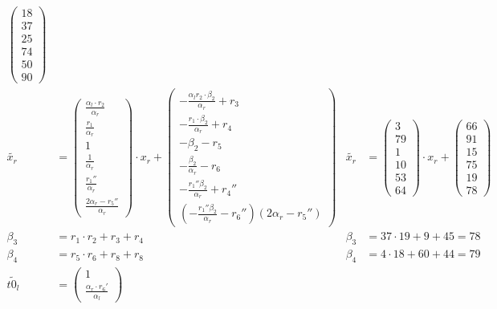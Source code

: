 \begin{align*}
\begin{pmatrix}18\\37\\25\\74\\50\\90\end{pmatrix}\\
%
\widetilde{x_r} & =
\begin{pmatrix}
  \frac{\alpha_l \cdot r_2}{\alpha_r}\\
  \frac{r_1}{\alpha_r}\\
  1\\
  \frac{1}{\alpha_r}\\
  \frac{r_1''}{\alpha_r}\\
  \frac{2\alpha_r-r_5''}{\alpha_r}
\end{pmatrix}
\cdot x_r +
\begin{pmatrix}
  -\frac{\alpha_lr_2 \cdot \beta_2}{\alpha_r} + r_3\\
  -\frac{r_1 \cdot \beta_2}{\alpha_r} + r_4\\
  -\beta_2-r_5\\
  -\frac{\beta_2}{\alpha_r}-r_6\\
  -\frac{r_1''\beta_2}{\alpha_r} + r_4''\\
  \left(-\frac{r_1''\beta_2}{\alpha_r} -r_6''\right)(2\alpha_r - r_5'')
\end{pmatrix}
&
\widetilde{x_r} & =
\begin{pmatrix}3\\79\\1\\10\\53\\64\end{pmatrix}
\cdot x_r +
\begin{pmatrix}66\\91\\15\\75\\19\\78\end{pmatrix}\\
%
\beta_3 &= r_1 \cdot r_2 + r_3 + r_4 & \beta_3 &= 37 \cdot 19 + 9 + 45 = 78\\
%
\beta_4 &= r_5 \cdot r_6 + r_8 + r_8 & \beta_4 &= 4 \cdot 18 + 60 + 44 = 79\\
%
\widetilde{t0_l} & =
\begin{pmatrix}
  1\\
  \frac{\alpha_r \cdot r_6'}{\alpha_l}
\end{pmatrix}

\end{align*}

